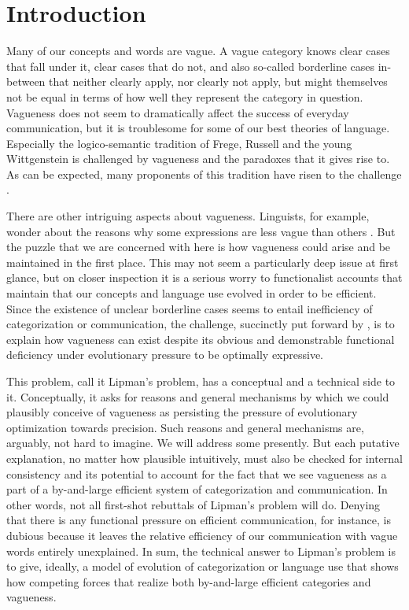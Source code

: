 \section{Introduction}

Many of our concepts and words are vague. A vague category knows clear
cases that fall under it, clear cases that do not, and also so-called
borderline cases in-between that neither clearly apply, nor clearly
not apply, but might themselves not be equal in terms of how well they
represent the category in question. Vagueness does not seem to
dramatically affect the success of everyday communication, but it is
troublesome for some of our best theories of language. Especially the
logico-semantic tradition of Frege, Russell and the young Wittgenstein
is challenged by vagueness and the paradoxes that it gives rise to. As
can be expected, many proponents of this tradition have risen to the
challenge \citep{Williamson1994:Vagueness}.

There are other intriguing aspects about vagueness. Linguists, for
example, wonder about the reasons why some expressions are less vague
than others \citep[e.g.][]{Kennedy2007:Vagueness-and-G}. But the
puzzle that we are concerned with here is how vagueness could arise
and be maintained in the first place. This may not seem a particularly
deep issue at first glance, but on closer inspection it is a serious
worry to functionalist accounts that maintain that our concepts and
language use evolved in order to be efficient. Since the existence of
unclear borderline cases seems to entail inefficiency of
categorization or communication, the challenge, succinctly put forward
by \citet{Lipman2009:Why-is-Language}, is to explain how vagueness can
exist despite its obvious and demonstrable functional deficiency under
evolutionary pressure to be optimally expressive.

This problem, call it Lipman's problem, has a conceptual and a
technical side to it. Conceptually, it asks for reasons and general
mechanisms by which we could plausibly conceive of vagueness as
persisting the pressure of evolutionary optimization towards
precision. Such reasons and general mechanisms are, arguably, not hard
to imagine. We will address some presently. But each putative
explanation, no matter how plausible intuitively, must also be checked
for internal consistency and its potential to account for the fact
that we see vagueness as a part of a by-and-large efficient system of
categorization and communication. In other words, not all first-shot
rebuttals of Lipman's problem will do. Denying that there is any
functional pressure on efficient communication, for instance, is
dubious because it leaves the relative efficiency of our communication
with vague words entirely unexplained. In sum, the technical answer to
Lipman's problem is to give, ideally, a model of evolution of
categorization or language use that shows how competing forces that
realize both by-and-large efficient categories and vagueness. 

